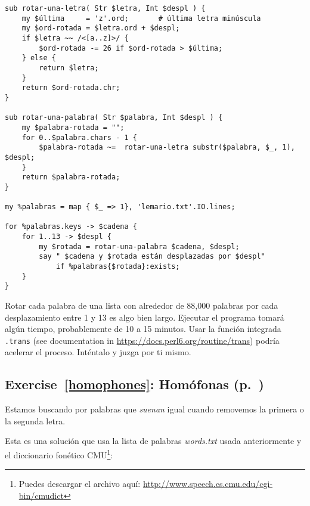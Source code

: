\begin{verbatim}
sub rotar-una-letra( Str $letra, Int $despl ) {
    my $última     = 'z'.ord;       # última letra minúscula
    my $ord-rotada = $letra.ord + $despl;
    if $letra ~~ /<[a..z]>/ { 
        $ord-rotada -= 26 if $ord-rotada > $última;
    } else {
        return $letra;
    }
    return $ord-rotada.chr;
}

sub rotar-una-palabra( Str $palabra, Int $despl ) {
    my $palabra-rotada = "";
    for 0..$palabra.chars - 1 {
        $palabra-rotada ~=  rotar-una-letra substr($palabra, $_, 1), $despl;
    }
    return $palabra-rotada;
}

my %palabras = map { $_ => 1}, 'lemario.txt'.IO.lines;

for %palabras.keys -> $cadena {
    for 1..13 -> $despl {
        my $rotada = rotar-una-palabra $cadena, $despl;
        say " $cadena y $rotada están desplazadas por $despl"
            if %palabras{$rotada}:exists;
    }
}
\end{verbatim}

Rotar cada palabra de una lista con alrededor de 88,000 palabras
por cada desplazamiento entre 1 y 13 es algo bien largo. 
Ejecutar el programa tomará algún tiempo, probablemente de 10 
a 15 minutos. Usar la función integrada \verb|.trans|
(see documentation in 
\url{https://docs.perl6.org/routine/trans}) podría acelerar
el proceso. Inténtalo y juzga por ti mismo.

\subsection{Exercise~\ref{homophones}: Homófonas (p.~\pageref{homophones})}
\label{sol_homophones}

Estamos buscando por palabras que \emph{suenan}
igual cuando removemos la primera o la segunda letra.

Esta es una solución que usa la lista de palabras \emph{words.txt}
usada anteriormente y el diccionario fonético CMU\footnote{Puedes
descargar el archivo aquí: \url{http://www.speech.cs.cmu.edu/cgi-bin/cmudict}}:

